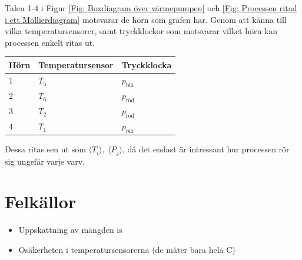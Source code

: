 \documentclass[11pt]{article}
\begin{document}
Talen 1-4 i Figur \ref{Fig: Boxdiagram över värmepumpen} och \ref{Fig: Processen ritad i ett Mollierdiagram} motsvarar de hörn som grafen har. Genom att känna till vilka temperatursensorer, samt tryckklockor som motsvarar vilket hörn kan processen enkelt ritas ut.

\begin{table}[h]
\centering
\label{my-label}
\begin{tabular}{l|l|l}
Hörn & Temperatursensor & Tryckklocka      \\ \hline
1    & $T_5$            & $p_{\text{blå}}$ \\ \hline
2    & $T_6$            & $p_{\text{röd}}$ \\ \hline
3    & $T_2$            & $p_{\text{röd}}$ \\ \hline
4    & $T_1$            & $p_{\text{blå}}$ \\ \hline
\end{tabular}
\end{table}

Dessa ritas sen ut som $\langle T_i \rangle, \ \langle P_j \rangle$, då det endast är intressant hur processen rör sig ungefär varje varv.

\section{Felkällor}

\begin{itemize}
    \item Uppskattning av mängden is
    \item Osäkerheten i temperatursensorerna (de mäter bara hela \degree C)
\end{itemize}
\end{document}
